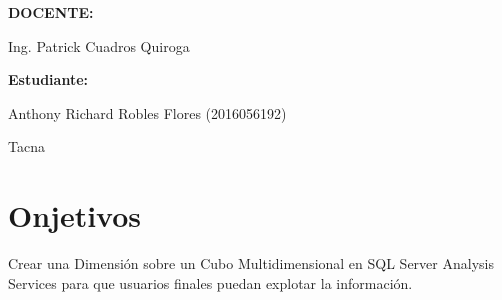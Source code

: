 \documentclass[12pt,letterpaper]{article}
\begin{document}
\begin{titlepage}
\begin{center}
\vspace*{0.3in}
\begin{Large}
\textbf{DOCENTE:} \\
\end{Large}

\vspace*{0.1in}
\begin{large}
 Ing. Patrick Cuadros Quiroga\\
\end{large}

\vspace*{0.4in}
\vspace*{0.1in}
\begin{large}
\textbf{Estudiante:} \\
\begin{flushleft}
Anthony Richard Robles Flores  \hfill	(2016056192)\\

\centering  %
\vspace*{0.9in}
\begin{large}
Tacna\\ 
\end{large}

\end{flushleft}
\end{large}
\end{center}

\end{titlepage}


\tableofcontents %
\thispagestyle{empty} %
\newpage
\setcounter{page}{1} %

\section{Onjetivos}
Crear una Dimensión sobre un Cubo Multidimensional en SQL Server Analysis Services para que usuarios
finales puedan explotar la información.

\end{document}
